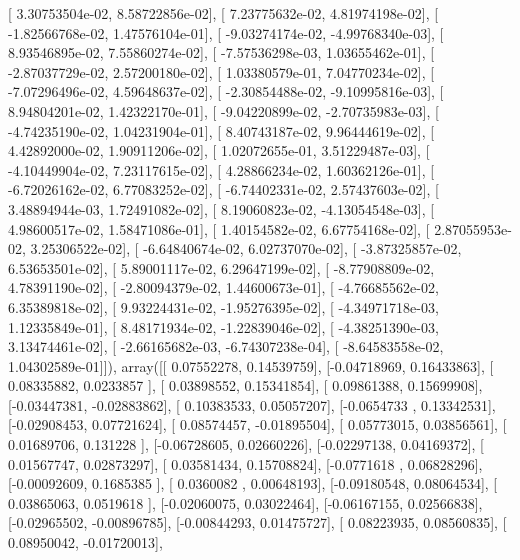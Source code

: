 \documentclass{article}
\begin{document}
       [  3.30753504e-02,   8.58722856e-02],
       [  7.23775632e-02,   4.81974198e-02],
       [ -1.82566768e-02,   1.47576104e-01],
       [ -9.03274174e-02,  -4.99768340e-03],
       [  8.93546895e-02,   7.55860274e-02],
       [ -7.57536298e-03,   1.03655462e-01],
       [ -2.87037729e-02,   2.57200180e-02],
       [  1.03380579e-01,   7.04770234e-02],
       [ -7.07296496e-02,   4.59648637e-02],
       [ -2.30854488e-02,  -9.10995816e-03],
       [  8.94804201e-02,   1.42322170e-01],
       [ -9.04220899e-02,  -2.70735983e-03],
       [ -4.74235190e-02,   1.04231904e-01],
       [  8.40743187e-02,   9.96444619e-02],
       [  4.42892000e-02,   1.90911206e-02],
       [  1.02072655e-01,   3.51229487e-03],
       [ -4.10449904e-02,   7.23117615e-02],
       [  4.28866234e-02,   1.60362126e-01],
       [ -6.72026162e-02,   6.77083252e-02],
       [ -6.74402331e-02,   2.57437603e-02],
       [  3.48894944e-03,   1.72491082e-02],
       [  8.19060823e-02,  -4.13054548e-03],
       [  4.98600517e-02,   1.58471086e-01],
       [  1.40154582e-02,   6.67754168e-02],
       [  2.87055953e-02,   3.25306522e-02],
       [ -6.64840674e-02,   6.02737070e-02],
       [ -3.87325857e-02,   6.53653501e-02],
       [  5.89001117e-02,   6.29647199e-02],
       [ -8.77908809e-02,   4.78391190e-02],
       [ -2.80094379e-02,   1.44600673e-01],
       [ -4.76685562e-02,   6.35389818e-02],
       [  9.93224431e-02,  -1.95276395e-02],
       [ -4.34971718e-03,   1.12335849e-01],
       [  8.48171934e-02,  -1.22839046e-02],
       [ -4.38251390e-03,   3.13474461e-02],
       [ -2.66165682e-03,  -6.74307238e-04],
       [ -8.64583558e-02,   1.04302589e-01]]), array([[ 0.07552278,  0.14539759],
       [-0.04718969,  0.16433863],
       [ 0.08335882,  0.0233857 ],
       [ 0.03898552,  0.15341854],
       [ 0.09861388,  0.15699908],
       [-0.03447381, -0.02883862],
       [ 0.10383533,  0.05057207],
       [-0.0654733 ,  0.13342531],
       [-0.02908453,  0.07721624],
       [ 0.08574457, -0.01895504],
       [ 0.05773015,  0.03856561],
       [ 0.01689706,  0.131228  ],
       [-0.06728605,  0.02660226],
       [-0.02297138,  0.04169372],
       [ 0.01567747,  0.02873297],
       [ 0.03581434,  0.15708824],
       [-0.0771618 ,  0.06828296],
       [-0.00092609,  0.1685385 ],
       [ 0.0360082 ,  0.00648193],
       [-0.09180548,  0.08064534],
       [ 0.03865063,  0.0519618 ],
       [-0.02060075,  0.03022464],
       [-0.06167155,  0.02566838],
       [-0.02965502, -0.00896785],
       [-0.00844293,  0.01475727],
       [ 0.08223935,  0.08560835],
       [ 0.08950042, -0.01720013],
\end{document}
